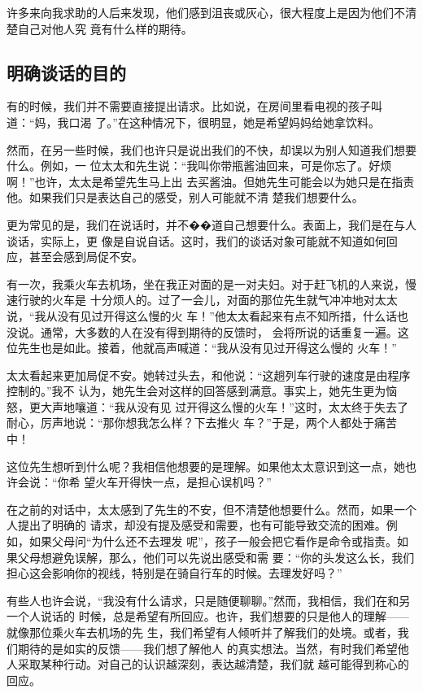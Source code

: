 \documentclass{ctexart}
\begin{document}
许多来向我求助的人后来发现，他们感到沮丧或灰心，很大程度上是因为他们不清楚自己对他人究
竟有什么样的期待。


\subsection{明确谈话的目的}

有的时候，我们并不需要直接提出请求。比如说，在房间里看电视的孩子叫道：``妈，我口渴
了。''在这种情况下，很明显，她是希望妈妈给她拿饮料。

然而，在另一些时候，我们也许只是说出我们的不快，却误以为别人知道我们想要什么。例如，一
位太太和先生说：``我叫你带瓶酱油回来，可是你忘了。好烦啊！''也许，太太是希望先生马上出
去买酱油。但她先生可能会以为她只是在指责他。如果我们只是表达自己的感受，别人可能就不清
楚我们想要什么。

更为常见的是，我们在说话时，并不��道自己想要什么。表面上，我们是在与人谈话，实际上，更
像是自说自话。这时，我们的谈话对象可能就不知道如何回应，甚至会感到局促不安。

有一次，我乘火车去机场，坐在我正对面的是一对夫妇。对于赶飞机的人来说，慢速行驶的火车是
十分烦人的。过了一会儿，对面的那位先生就气冲冲地对太太说，``我从没有见过开得这么慢的火
车！''他太太看起来有点不知所措，什么话也没说。通常，大多数的人在没有得到期待的反馈时，
会将所说的话重复一遍。这位先生也是如此。接着，他就高声喊道：``我从没有见过开得这么慢的
火车！''

太太看起来更加局促不安。她转过头去，和他说：``这趟列车行驶的速度是由程序控制的。''我不
认为，她先生会对这样的回答感到满意。事实上，她先生更为恼怒，更大声地嚷道：``我从没有见
过开得这么慢的火车！''这时，太太终于失去了耐心，厉声地说：``那你想我怎么样？下去推火
车？''于是，两个人都处于痛苦中！

这位先生想听到什么呢？我相信他想要的是理解。如果他太太意识到这一点，她也许会说：``你希
望火车开得快一点，是担心误机吗？''

在之前的对话中，太太感到了先生的不安，但不清楚他想要什么。然而，如果一个人提出了明确的
请求，却没有提及感受和需要，也有可能导致交流的困难。例如，如果父母问``为什么还不去理发
呢''，孩子一般会把它看作是命令或指责。如果父母想避免误解，那么，他们可以先说出感受和需
要：``你的头发这么长，我们担心这会影响你的视线，特别是在骑自行车的时候。去理发好吗？''

有些人也许会说，``我没有什么请求，只是随便聊聊。''然而，我相信，我们在和另一个人说话的
时候，总是希望有所回应。也许，我们想要的只是他人的理解------就像那位乘火车去机场的先
生，我们希望有人倾听并了解我们的处境。或者，我们期待的是如实的反馈------我们想了解他人
的真实想法。当然，有时我们希望他人采取某种行动。对自己的认识越深刻，表达越清楚，我们就
越可能得到称心的回应。
\end{document}
